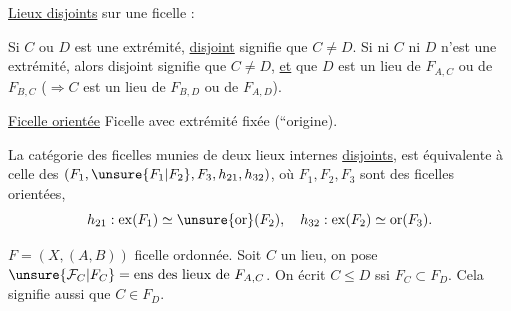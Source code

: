 
\uline{Lieux disjoints}  sur une ficelle :

Si $C$ ou $D$ est une extrémité, \uline{disjoint} signifie que $C\ne D$. Si ni $C$ ni $D$ n'est une extrémité, alors disjoint signifie que
 $C\ne D$, \uline{et} que $D$ est un lieu de $F_{A,C}$ ou de $F_{B,C}$ ($\Rightarrow C$ est un lieu de $F_{B,D}$ ou de $F_{A,D}$).

\uline{Ficelle orientée} Ficelle avec extrémité fixée (``origine).

 La catégorie des ficelles  munies de deux lieux internes \uline{disjoints}, est équivalente à celle des   $(F_1,\unsure{F_1|F_2},F_3,h_{21},h_{32})$, où $F_1,F_2,F_3$ sont des ficelles orientées,
\[
h_{21}:\operatorname{ex}(F_1)\simeq\unsure{\operatorname{or}}(F_2),\quad
h_{32}:\operatorname{ex}(F_2)\simeq\operatorname{or}(F_3).
\]

$F=(X,(A,B))$ ficelle ordonnée. Soit $C$ un lieu, on pose $\unsure{\mathcal F_C|F_C}={}\text{ens des lieux de }F_{A,C}$.
On écrit $C\le D$ ssi $F_C\subset F_D$. Cela signifie aussi que $C\in F_D$.

